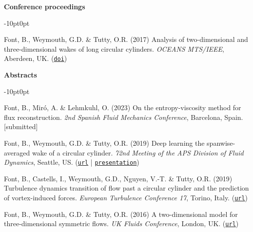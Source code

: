 \documentclass[line]{res}
\newenvironment{p}
  {\begin{adjustwidth}{-10pt}{0pt}}
  {\end{adjustwidth}}
\begin{document}
\begin{resume}
\hspace{-1cm}\textbf{Conference proceedings}\vspace{0.25cm}
\begin{p}
\begin{etaremune}[leftmargin=-2pt,parsep=5pt]
\item Font, B., Weymouth, G.D.  \&  Tutty, O.R. (2017) Analysis of two-dimensional and three-dimensional wakes of long circular cylinders. {\em OCEANS MTS/IEEE}, Aberdeen, UK. (\href{https://doi.org/10.1109/OCEANSE.2017.8084904}{\texttt{doi}})
\end{etaremune}
\end{p}

\hspace{-1cm}\textbf{Abstracts}\vspace{0.25cm}
\begin{p}
\begin{etaremune}[leftmargin=0pt,parsep=5pt]
\item Font, B., Mir\'{o}, A. \&  Lehmkuhl, O. (2023)  On the entropy-viscosity method for flux reconstruction. \textit{2nd Spanish Fluid Mechanics Conference}, Barcelona, Spain. [submitted]
\item Font, B., Weymouth, G.D.  \&  Tutty, O.R. (2019)  Deep learning the spanwise-averaged wake of a circular cylinder. \textit{72nd Meeting of the APS Division of Fluid Dynamics}, Seattle, US. (\href{https://meetings.aps.org/Meeting/DFD19/Session/L17.5}{\texttt{url}} | \href{https://github.com/b-fg/APS2019}{\texttt{presentation}})
\item Font, B., Castells, I., Weymouth, G.D., Nguyen, V.-T.  \&  Tutty, O.R. (2019)  Turbulence dynamics transition of flow past a circular cylinder and the prediction of vortex-induced forces. \textit{European Turbulence Conference 17}, Torino, Italy. (\href{https://etc17.fyper.com/program/show_slot/41}{\texttt{url}})
\item Font, B., Weymouth, G.D.  \&  Tutty, O.R. (2016)  A two-dimensional model for three-dimensional symmetric flows. \textit{UK Fluids Conference}, London, UK. (\href{https://www.imperial.ac.uk/media/imperial-college/faculty-of-engineering/aeronautics/UK-Fluids-Conference-2016-booklet.pdf}{\texttt{url}})
\end{etaremune}
\end{p}


\end{resume}
\end{document}
